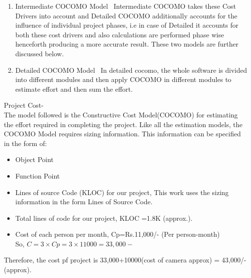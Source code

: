 \documentclass[oneside,a4paper,12pt]{report}
\begin{document}
{\begin{enumerate}
\begin{center} $ D=cb(E)^d b$\\
\end{center}
Where,\\
 D = Development time in chronological months, cb = 2.5 and db = 0.35, and E =6 Person-Month\\
 Hence, Development Time= 2.5 (1.8)0.35\\
 D = 3.07 months\\
 The approximate duration of project is 3 months.\\

 P = E/D\\
 Where,\\
 P = Number of persons to accomplish project.\\
Hence, Number of Persons required completing the project\\
 P = 6/3\\
 P = 2 persons\\
 Therefore 2 persons are required to successfully complete the project on schedule.\\

\item Intermediate COCOMO Model
\ Intermediate COCOMO takes these Cost Drivers into account and Detailed COCOMO additionally accounts for the influence of individual project phases, i.e in case of Detailed it accounts for both these cost drivers and also calculations are performed phase wise henceforth producing a more accurate result. These two models are further discussed below.
\item Detailed COCOMO Model
\ In detailed cocomo, the whole software is divided into different modules and then apply COCOMO in different modules to estimate effort and then sum the effort.\
\end{enumerate}

 Project Cost-\\

The model followed is the Constructive Cost Model(COCOMO) for estimating the effort required in completing the project. Like all the estimation models, the COCOMO Model requires sizing information. This information can be specified in the form of:
\begin{itemize}
\item Object Point
\item Function Point
\item Lines of source Code (KLOC) for our project, This work uses the sizing information in the form Lines of Source Code.
\item Total lines of code for our project, KLOC =1.8K (approx.).
\item Cost of each person per month, Cp=Rs.11,000/- (Per person-month)\\
 So, $ C=3 \times Cp=3 \times 11000= 33,000- $
\end{itemize} 
Therefore, the cost pf project is 33,000+10000(cost of camera approx) = 43,000/- (approx).\\

}
\end{document}
